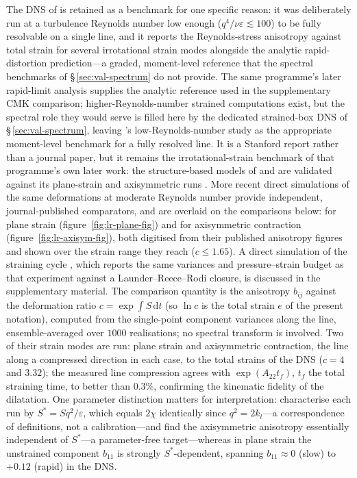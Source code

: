 \documentclass[lineno]{JFM-FLM_Au}
\begin{document}
The DNS of \citet{LeeReynolds1985} is retained as a benchmark for one
specific reason: it was deliberately run at a turbulence Reynolds number
low enough ($q^4/\nu\varepsilon\lesssim100$) to be fully resolvable on a
single line, and it reports the Reynolds-stress anisotropy against total
strain for several irrotational strain modes alongside the analytic
rapid-distortion prediction---a graded, moment-level reference that the
spectral benchmarks of \S\,\ref{sec:val-spectrum} do not provide. The
same programme's later rapid-limit analysis
\citep{LeePiomelliReynolds1986} supplies the analytic reference used in
the supplementary CMK comparison; higher-Reynolds-number strained
computations exist, but the spectral role they would serve is filled
here by the dedicated strained-box DNS of \S\,\ref{sec:val-spectrum},
leaving \citeauthor{LeeReynolds1985}'s low-Reynolds-number study as the
appropriate moment-level benchmark for a fully resolved line. It is a
Stanford report rather than a journal paper, but it remains the
irrotational-strain benchmark of that programme's own later work: the
structure-based models of \citet{ReynoldsKassinos1995} and
\citet{KassinosReynoldsRogers2001} are validated against its plane-strain
and axisymmetric runs \citep{KassinosReynolds1998}. More recent direct
simulations of the same deformations at moderate Reynolds number provide
independent, journal-published comparators, and are overlaid on the
comparisons below: \citet{ZusiPerot2013} for plane strain
(figure~\ref{fig:lr-plane-fig}) and \citet{ZusiPerot2014} for
axisymmetric contraction (figure~\ref{fig:lr-axisym-fig}), both digitised
from their published anisotropy figures and shown over the strain range
they reach ($c\le1.65$). A direct simulation of the
\citeauthor{ChenMeneveauKatz2006} straining cycle
\citep{GualtieriMeneveau2010}, which reports the same variances and
pressure--strain budget as that experiment against a
Launder--Reece--Rodi closure, is discussed in the supplementary material.
The
comparison quantity is the anisotropy $b_{ij}$ against the deformation
ratio $c=\exp\int S\,\mathrm{d}t$ (so $\ln c$ is the total strain $e$ of
the present notation), computed from the single-point component
variances along the line, ensemble-averaged over $1000$ realisations;
no spectral transform is involved. Two of their strain modes are run:
plane strain and axisymmetric contraction, the line along a compressed
direction in each case, to the total strains of the DNS ($c=4$ and
$3.32$); the measured line compression agrees with $\exp(A_{22}t_f)$, $t_f$ the total straining time, to better than $0.3\%$, confirming the kinematic
fidelity of the dilatation. One parameter distinction matters for
interpretation: \citeauthor{LeeReynolds1985} characterise each run by
$S^{*}=Sq^2/\varepsilon$, which equals $2\chi$ identically since
$q^2=2k_t$---a correspondence of definitions, not a calibration---and
find the axisymmetric anisotropy
essentially independent of $S^{*}$---a parameter-free target---whereas in plane strain the unstrained component $b_{11}$ is
strongly $S^{*}$-dependent, spanning $b_{11}\approx0$ (slow) to
$+0.12$ (rapid) in the DNS.
\end{document}
